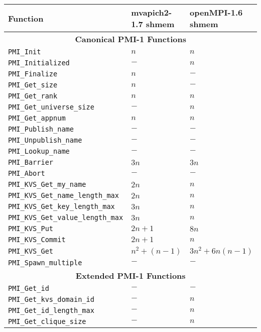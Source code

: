 \begin{table}
\centering
\begin{tabular}{|p{8cm}|p{3.5cm}|p{3cm}|}\hline
\textbf{Function} & \textbf{mvapich2-1.7 shmem} & \textbf{openMPI-1.6 shmem}\\
\hline
\multicolumn{3}{|c|}{\textbf{Canonical PMI-1 Functions}}\\
\hline
{\tt  PMI\_Init} & $n$ & $n$\\
\hline
{\tt  PMI\_Initialized} & $-$ & $n$\\
\hline
{\tt  PMI\_Finalize} & $n$ & $-$\\
\hline
{\tt  PMI\_Get\_size} & $n$ & $-$\\
\hline
{\tt  PMI\_Get\_rank} & $n$ & $n$\\
\hline
{\tt  PMI\_Get\_universe\_size} & $-$ & $n$\\
\hline
{\tt  PMI\_Get\_appnum} & $n$ & $n$\\
\hline
{\tt  PMI\_Publish\_name} & $-$ & $-$\\
\hline
{\tt  PMI\_Unpublish\_name} & $-$ & $-$\\
\hline
{\tt  PMI\_Lookup\_name} & $-$ & $-$\\
\hline
{\tt  PMI\_Barrier} & $3n$ & $3n$ \\
\hline
{\tt  PMI\_Abort} & $-$ & $-$\\
\hline
{\tt  PMI\_KVS\_Get\_my\_name} & $2n$ & $n$\\
\hline
{\tt  PMI\_KVS\_Get\_name\_length\_max} & $2n$ & $n$\\
\hline
{\tt  PMI\_KVS\_Get\_key\_length\_max} & $3n$ & $n$\\
\hline
{\tt  PMI\_KVS\_Get\_value\_length\_max} & $3n$ & $n$\\
\hline
{\tt  PMI\_KVS\_Put} & $2n + 1$ & $8n$\\
\hline
{\tt  PMI\_KVS\_Commit} & $2n + 1$ & $n$\\
\hline
{\tt  PMI\_KVS\_Get} & $n^2 + (n - 1)$ & $3n^2 + 6n(n - 1)$ \\
\hline
{\tt  PMI\_Spawn\_multiple} & $-$ & $-$ \\
\hline
\multicolumn{3}{|c|}{\textbf{Extended PMI-1 Functions}}\\
\hline
{\tt  PMI\_Get\_id} & $-$ & $-$ \\
\hline
{\tt  PMI\_Get\_kvs\_domain\_id} & $-$ & $n$ \\
\hline
{\tt  PMI\_Get\_id\_length\_max} & $-$ & $n$ \\
\hline
{\tt  PMI\_Get\_clique\_size} & $-$ & $n$ \\

\end{tabular}
\end{table}
